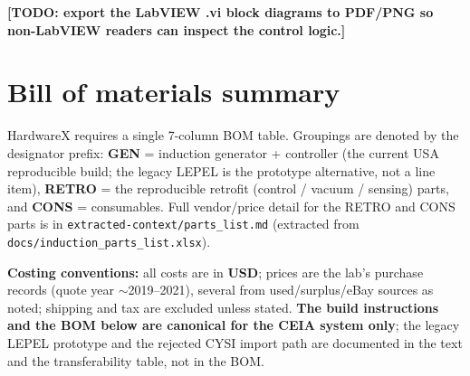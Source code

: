 \documentclass[5p,times]{elsarticle}
\newcommand{\todo}[1]{{\color{red}\textbf{[TODO: #1]}}}
\begin{document}
\todo{export the LabVIEW .vi block diagrams to PDF/PNG so non-LabVIEW readers can
inspect the control logic.}

\section{Bill of materials summary}

HardwareX requires a single 7-column BOM table. Groupings are denoted by the
designator prefix: \textbf{GEN} = induction generator + controller (the current USA
reproducible build; the legacy LEPEL is the prototype alternative, not a line item),
\textbf{RETRO} = the reproducible retrofit (control / vacuum / sensing) parts, and
\textbf{CONS} = consumables. Full vendor/price detail for the RETRO and CONS parts is
in \texttt{extracted-context/parts\_list.md} (extracted from
\texttt{docs/induction\_parts\_list.xlsx}).

\textbf{Costing conventions:} all costs are in \textbf{USD}; prices are the lab's
purchase records (quote year $\sim$2019--2021), several from used/surplus/eBay sources
as noted; shipping and tax are excluded unless stated. \textbf{The build instructions
and the BOM below are canonical for the CEIA system only}; the legacy LEPEL prototype
and the rejected CYSI import path are documented in the text and the transferability
table, not in the BOM.
\end{document}
